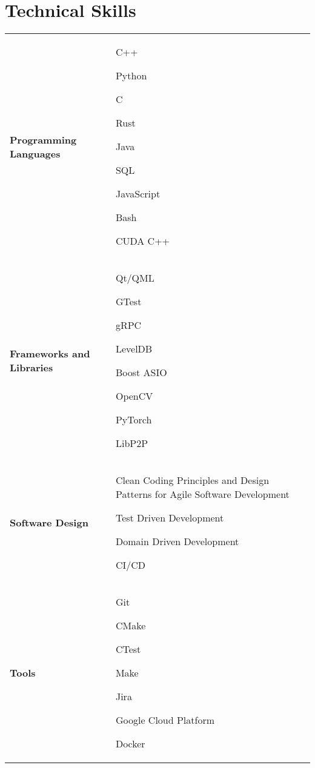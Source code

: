 \documentclass[letterpaper,11pt]{article}
\begin{document}
\section{Technical Skills}
\small {
\begin{tabular*}{0.97\textwidth}{l p{13cm}}
      \textbf{Programming Languages} &
      \begin{itemize*}
        \item[] C++ \item Python \item C \item Rust \item Java \item SQL \item JavaScript \item Bash \item CUDA C++
      \end{itemize*} \\ [1.5mm]

      \textbf{Frameworks and Libraries} &
      \begin{itemize*}
        \item[] Qt/QML \item GTest \item gRPC \item LevelDB \item Boost ASIO \item OpenCV \item PyTorch \item LibP2P
      \end{itemize*} \\ [1.5mm]
    
      \textbf{Software Design} &
      \begin{itemize*}
        \item[]Clean Coding Principles and Design Patterns for Agile Software Development
        \item Test Driven Development
        \item Domain Driven Development
        \item CI/CD
      \end{itemize*} \\ [1.5mm]
    
      \textbf{Tools} &
      \begin{itemize*}
        \item[] Git
        \item CMake
        \item CTest
        \item Make
        \item Jira
        \item Google Cloud Platform
        \item Docker
      \end{itemize*}
\end{tabular*}\vspace{-7pt}
}
\end{document}
